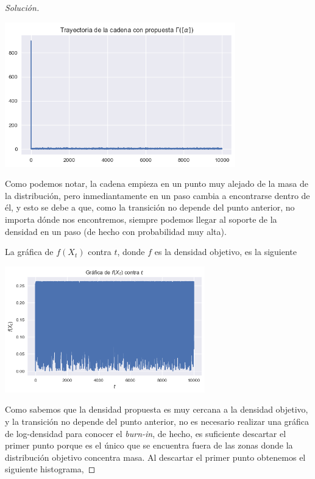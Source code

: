 \documentclass{article}
\begin{document}
\begin{enumerate}
\begin{proof}[Solución]
        \begin{center}
            \includegraphics[width=0.75\textwidth]{tarea7/trajgamex2.png}
        \end{center}

        Como podemos notar, la cadena empieza en un punto muy alejado de la masa de la distribución,
        pero inmediantamente en un paso cambia a encontrarse dentro de él, y esto se debe a que,
        como la transición no depende del punto anterior, no importa dónde nos encontremos, siempre
        podemos llegar al soporte de la densidad en un paso (de hecho con probabilidad muy alta).

        La gráfica de $f(X_t)$ contra $t$, donde $f$ es la densidad objetivo, es la siguiente

        \begin{center}
            \includegraphics[width=0.65\textwidth]{tarea7/ft_t_traj.png}
        \end{center}

        Como sabemos que la densidad propuesta es muy cercana a la densidad objetivo, y la transición
        no depende del punto anterior, no es necesario realizar una gráfica de log-densidad para
        conocer el \textit{burn-in}, de hecho, es suficiente descartar el primer punto porque es
        el único que se encuentra fuera de las zonas donde la distribución objetivo concentra masa.
        Al descartar el primer punto obtenemos el siguiente histograma,


\end{proof}
\end{enumerate}
\end{document}
